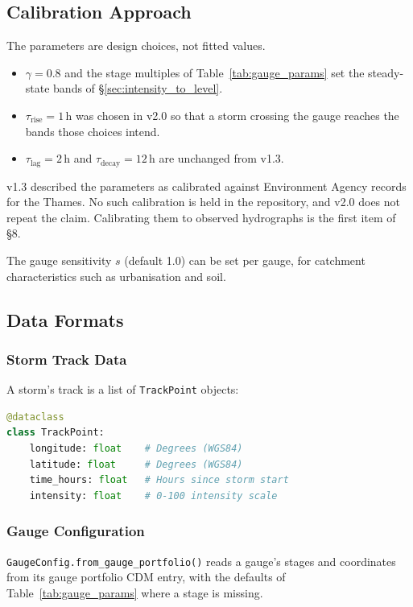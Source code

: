 \documentclass[11pt,a4paper]{article}
\begin{document}
\subsection{Calibration Approach}

The parameters are design choices, not fitted values.
\begin{itemize}[nosep]
    \item $\gamma = 0.8$ and the stage multiples of Table~\ref{tab:gauge_params} set
          the steady-state bands of \S\ref{sec:intensity_to_level}.
    \item $\tau_{\text{rise}} = 1$\,h was chosen in v2.0 so that a storm crossing the
          gauge reaches the bands those choices intend.
    \item $\tau_{\text{lag}}=2$\,h and $\tau_{\text{decay}}=12$\,h are unchanged from
          v1.3.
\end{itemize}
v1.3 described the parameters as calibrated against Environment Agency records for the
Thames. No such calibration is held in the repository, and v2.0 does not repeat the
claim. Calibrating them to observed hydrographs is the first item of \S8.

The gauge sensitivity $s$ (default 1.0) can be set per gauge, for catchment
characteristics such as urbanisation and soil.

\subsection{Data Formats}

\subsubsection{Storm Track Data}
A storm's track is a list of \texttt{TrackPoint} objects:
\begin{lstlisting}[language=Python]
@dataclass
class TrackPoint:
    longitude: float    # Degrees (WGS84)
    latitude: float     # Degrees (WGS84)
    time_hours: float   # Hours since storm start
    intensity: float    # 0-100 intensity scale
\end{lstlisting}

\subsubsection{Gauge Configuration}
\texttt{GaugeConfig.from\_gauge\_portfolio()} reads a gauge's stages and coordinates from
its gauge portfolio CDM entry, with the defaults of Table~\ref{tab:gauge_params} where a
stage is missing.
\end{document}
